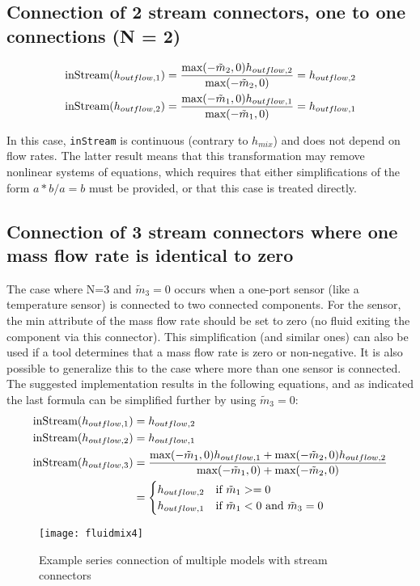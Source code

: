 \subsection{Connection of 2 stream connectors, one to one connections (N = 2)}\label{connection-of-2-stream-connectors-one-to-one-connections-n-2}

\begin{align*}
\text{\lstinline!inStream!}(h_{outflow,1}) &= \frac{\text{max}(-\tilde{m}_2,0)h_{outflow,2}}{\text{max}(-\tilde{m}_2,0)}=h_{outflow,2}\\
\text{\lstinline!inStream!}(h_{outflow,2}) &= \frac{\text{max}(-\tilde{m}_1,0)h_{outflow,1}}{\text{max}(-\tilde{m}_1,0)}=h_{outflow,1}
\end{align*}

In this case, \lstinline!inStream! is continuous (contrary to $h_{mix}$) and does not
depend on flow rates. The latter result means that this transformation
may remove nonlinear systems of equations, which requires that either
simplifications of the form $a * b / a = b$ must be provided, or that this
case is treated directly.

\subsection{Connection of 3 stream connectors where one mass flow rate is identical to zero}\label{connection-of-3-stream-connectors-where-one-mass-flow-rate-is-identical-to-zero-n-3-and}
The case where N=3 and $\tilde{m}_3=0$ occurs when a one-port sensor (like a temperature sensor) is
connected to two connected components. For the sensor, the min attribute
of the mass flow rate should be set to zero (no fluid exiting the
component via this connector).
This simplification (and similar ones) can also be used if a tool determines that a mass flow rate is zero or non-negative.
It is also possible to generalize this to the case where more than one sensor is connected.
The suggested implementation results in
the following equations, and as indicated the last formula can be
simplified further by using $\tilde{m}_3=0$:
\begin{align*}
\text{\lstinline!inStream!}(h_{outflow,1}) &= h_{outflow,2}\\
\text{\lstinline!inStream!}(h_{outflow,2}) &= h_{outflow,1}\\
\text{\lstinline!inStream!}(h_{outflow,3}) &= \frac{\text{max}(-\tilde{m}_1,0)h_{outflow,1}+\text{max}(-\tilde{m}_2,0)h_{outflow,2}}{\text{max}(-\tilde{m}_1,0)+\text{max}(-\tilde{m}_2,0)}\\
&=
\begin{cases}
h_{outflow,2}&\text{if $\tilde{m}_1>=0$}\\
h_{outflow,1}&\text{if $\tilde{m}_1<0$ and $\tilde{m}_3=0$}
\end{cases}
\end{align*}
\begin{figure}[H]
\caption{Example series connection of multiple models with stream connectors }
\begin{center}
\texttt{[image: fluidmix4]}
\end{center}
\end{figure}

